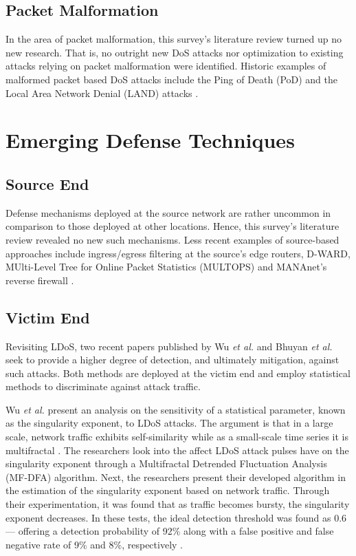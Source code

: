 \documentclass[conference]{IEEEtran}
\begin{document}
\subsection{Packet Malformation}
In the area of packet malformation, this survey's literature review turned up no new research. That is, no outright new DoS attacks nor optimization to existing attacks relying on packet malformation were identified. Historic examples of malformed packet based DoS attacks include the Ping of Death (PoD) and the Local Area Network Denial (LAND) attacks \cite{SecuringCloudServers:Chapade}. 

\section{Emerging Defense Techniques}
\subsection{Source End}
Defense mechanisms deployed at the source network are rather uncommon in comparison to those deployed at other locations. Hence, this survey's literature review revealed no new such mechanisms. Less recent examples of source-based approaches include ingress/egress filtering at the source's edge routers, D-WARD, MUlti-Level Tree for Online Packet Statistics (MULTOPS) and MANAnet's reverse firewall \cite{Zargar:DDOSFlood}.

\subsection{Victim End}
Revisiting LDoS, two recent papers published by Wu \textit{et al.} \cite{Wu:LDoSMultifractal} and Bhuyan \textit{et al.} \cite{Bhuyan:partialRank} seek to provide a higher degree of detection, and ultimately mitigation, against such attacks. Both methods are deployed at the victim end and employ statistical methods to discriminate against attack traffic.

Wu \textit{et al.} present an analysis on the sensitivity of a statistical parameter, known as the singularity exponent, to LDoS attacks. The argument is that in a large scale, network traffic exhibits self-similarity while as a small-scale time series it is multifractal \cite{Wu:LDoSMultifractal}. The researchers look into the affect LDoS attack pulses have on the singularity exponent through a Multifractal Detrended Fluctuation Analysis (MF-DFA) algorithm. Next, the researchers present their developed algorithm in the estimation of the singularity exponent based on network traffic. Through their experimentation, it was found that as traffic becomes bursty, the singularity exponent decreases. In these tests, the ideal detection threshold was found as 0.6 --- offering a detection probability of 92\% along with a false positive and false negative rate of 9\% and 8\%, respectively \cite{Wu:LDoSMultifractal}.
\end{document}
